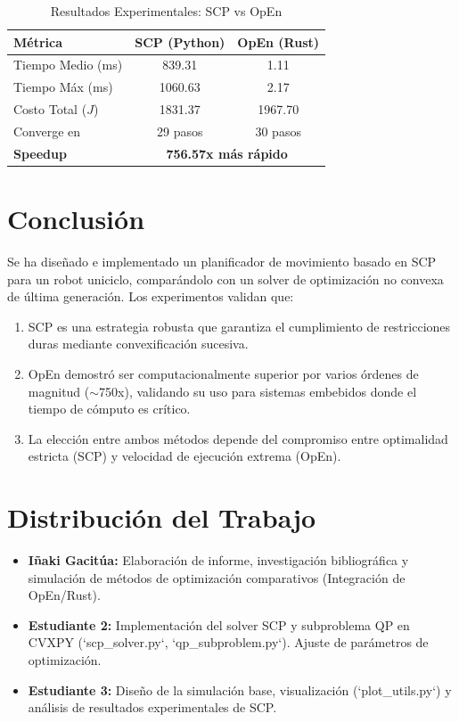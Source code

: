 \documentclass[conference]{IEEEtran}
\begin{document}
\begin{table}[H]
\caption{Resultados Experimentales: SCP vs OpEn}
\begin{center}
\begin{tabular}{lcc}
\toprule
\textbf{Métrica} & \textbf{SCP (Python)} & \textbf{OpEn (Rust)} \\
\midrule
Tiempo Medio (ms) & 839.31 & 1.11 \\
Tiempo Máx (ms) & 1060.63 & 2.17 \\
Costo Total ($J$) & 1831.37 & 1967.70 \\
Converge en & 29 pasos & 30 pasos \\
\midrule
\textbf{Speedup} & \multicolumn{2}{c}{\textbf{756.57x más rápido}} \\
\bottomrule
\end{tabular}
\label{tab:comparacion}
\end{center}
\end{table}

\section{Conclusión}

Se ha diseñado e implementado un planificador de movimiento basado en SCP para un robot uniciclo, comparándolo con un solver de optimización no convexa de última generación. Los experimentos validan que:
\begin{enumerate}
    \item SCP es una estrategia robusta que garantiza el cumplimiento de restricciones duras mediante convexificación sucesiva.
    \item OpEn demostró ser computacionalmente superior por varios órdenes de magnitud ($\sim$750x), validando su uso para sistemas embebidos donde el tiempo de cómputo es crítico.
    \item La elección entre ambos métodos depende del compromiso entre optimalidad estricta (SCP) y velocidad de ejecución extrema (OpEn).
\end{enumerate}

\section{Distribución del Trabajo}

\begin{itemize}
    \item \textbf{Iñaki Gacitúa:} Elaboración de informe, investigación bibliográfica y simulación de métodos de optimización comparativos (Integración de OpEn/Rust).
    \item \textbf{Estudiante 2:} Implementación del solver SCP y subproblema QP en CVXPY (`scp\_solver.py`, `qp\_subproblem.py`). Ajuste de parámetros de optimización.
    \item \textbf{Estudiante 3:} Diseño de la simulación base, visualización (`plot\_utils.py`) y análisis de resultados experimentales de SCP.
\end{itemize}
\end{document}
